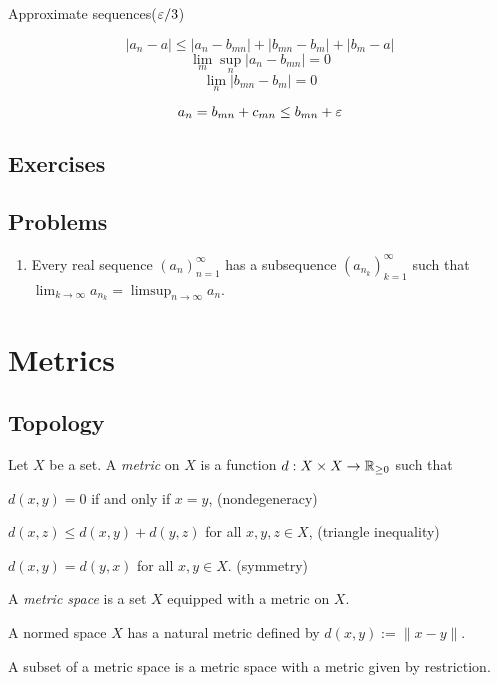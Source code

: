 \documentclass{../../large}
\begin{document}
Approximate sequences($\varepsilon/3$)




\begin{prb}
\[|a_n-a|\le|a_n-b_{mn}|+|b_{mn}-b_m|+|b_m-a|\]
\[\lim_m\sup_n|a_n-b_{mn}|=0\]
\[\lim_n|b_{mn}-b_m|=0\]
\end{prb}

\[a_n=b_{mn}+c_{mn}\le b_{mn}+\varepsilon\]





\section*{Exercises}
\begin{prb}
\end{prb}
\begin{prb}
\end{prb}
\section*{Problems}
\begin{enumerate}
\item Every real sequence $(a_n)_{n=1}^\infty$ has a subsequence $(a_{n_k})_{k=1}^\infty$ such that $\lim_{k\to\infty}a_{n_k}=\limsup_{n\to\infty}a_n$.
\end{enumerate}







\chapter{Metrics}
\section{Topology}
\begin{prb}
Let $X$ be a set.
A \emph{metric} on $X$ is a function $d:X\times X\to\mathbb{R}_{\ge0}$ such that
\begin{parts}[(i)]
\item $d(x,y)=0$ if and only if $x=y$, \hfill(nondegeneracy)
\item $d(x,z)\le d(x,y)+d(y,z)$ for all $x,y,z\in X$, \hfill(triangle inequality)
\item $d(x,y)=d(y,x)$ for all $x,y\in X$. \hfill(symmetry)
\end{parts}
A \emph{metric space} is a set $X$ equipped with a metric on $X$.
\begin{parts}
\item A normed space $X$ has a natural metric defined by $d(x,y):=\|x-y\|$.
\item A subset of a metric space is a metric space with a metric given by restriction.
\end{parts}
\end{prb}
\end{document}
